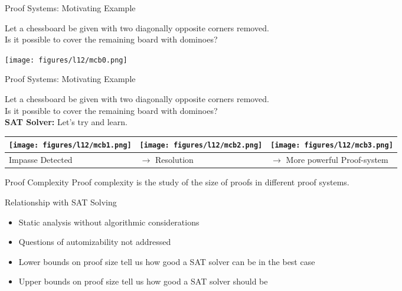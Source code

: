 \documentclass[t]{sdqbeamer}
\begin{document}
\begin{frame}{Proof Systems: Motivating Example}
\begin{example}
Let a chessboard be given with two diagonally opposite corners removed.\\
Is it possible to cover the remaining board with dominoes?\\[1ex]
\begin{center}
\texttt{[image: figures/l12/mcb0.png]}
\end{center}
\end{example}
\end{frame}


\begin{frame}{Proof Systems: Motivating Example}
\begin{example}
Let a chessboard be given with two diagonally opposite corners removed.\\
Is it possible to cover the remaining board with dominoes?\\[1ex]
\textbf{SAT Solver:} Let's try and learn.\\
\begin{tabularx}{\linewidth}{XXX}
    \texttt{[image: figures/l12/mcb1.png]} &
    \texttt{[image: figures/l12/mcb2.png]} &
    \texttt{[image: figures/l12/mcb3.png]}\\
    \hline
    Impasse Detected & $\rightarrow$ Resolution & $\rightarrow$ More powerful Proof-system
\end{tabularx}
\end{example}
\end{frame}


\begin{frame}{Proof Complexity}
Proof complexity is the study of the size of proofs in different proof systems.\\[1ex]
\begin{block}{Relationship with SAT Solving}
\begin{itemize}\setlength{\itemsep}{1ex}
\item Static analysis without algorithmic considerations
\item Questions of automizability not addressed
\item Lower bounds on proof size tell us how good a SAT solver can be in the best case 
\item Upper bounds on proof size tell us how good a SAT solver should be
\end{itemize}
\end{block}
\end{frame}
\end{document}
